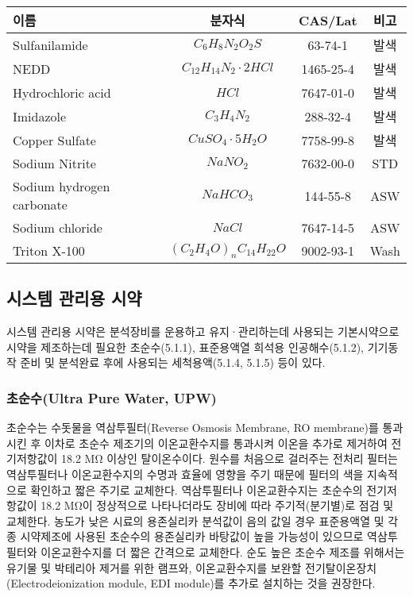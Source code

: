 \documentclass[
]{book}
\begin{document}
\begin{longtable}[]{@{}lccc@{}}
\toprule()
이름 & 분자식 & CAS/Lat & 비고 \\
\midrule()
\endhead
Sulfanilamide & \(C_6H_8N_2O_2S\) & 63-74-1 & 발색 \\
NEDD & \(C_{12}H_{14}N_2 \cdot 2HCl\) & 1465-25-4 & 발색 \\
Hydrochloric acid & \(HCl\) & 7647-01-0 & 발색 \\
Imidazole & \(C_3H_4N_2\) & 288-32-4 & 발색 \\
Copper Sulfate & \(CuSO_4 \cdot 5H_2O\) & 7758-99-8 & 발색 \\
Sodium Nitrite & \(NaNO_2\) & 7632-00-0 & STD \\
Sodium hydrogen carbonate & \(NaHCO_3\) & 144-55-8 & ASW \\
Sodium chloride & \(NaCl\) & 7647-14-5 & ASW \\
Triton X-100 & \((C_2H_4O)_n C_{14}H_{22}O\) & 9002-93-1 & Wash \\
\bottomrule()
\end{longtable}

\hypertarget{uxc2dcuxc2a4uxd15c-uxad00uxb9acuxc6a9-uxc2dcuxc57d}{%
\subsection{시스템 관리용 시약}\label{uxc2dcuxc2a4uxd15c-uxad00uxb9acuxc6a9-uxc2dcuxc57d}}

시스템 관리용 시약은 분석장비를 운용하고 유지·관리하는데 사용되는 기본시약으로 시약을 제조하는데 필요한 초순수(5.1.1), 표준용액열 희석용 인공해수(5.1.2), 기기동작 준비 및 분석완료 후에 사용되는 세척용액(5.1.4, 5.1.5) 등이 있다.

\hypertarget{uxcd08uxc21cuxc218ultra-pure-water-upw}{%
\subsubsection{초순수(Ultra Pure Water, UPW)}\label{uxcd08uxc21cuxc218ultra-pure-water-upw}}

초순수는 수돗물을 역삼투필터(Reverse Osmosis Membrane, RO membrane)를 통과시킨 후 이차로 초순수 제조기의 이온교환수지를 통과시켜 이온을 추가로 제거하여 전기저항값이 18.2 MΩ 이상인 탈이온수이다. 원수를 처음으로 걸러주는 전처리 필터는 역삼투필터나 이온교환수지의 수명과 효율에 영향을 주기 때문에 필터의 색을 지속적으로 확인하고 짧은 주기로 교체한다. 역삼투필터나 이온교환수지는 초순수의 전기저항값이 18.2 MΩ이 정상적으로 나타나더라도 장비에 따라 주기적(분기별)로 점검 및 교체한다. 농도가 낮은 시료의 용존실리카 분석값이 음의 값일 경우 표준용액열 및 각종 시약제조에 사용된 초순수의 용존실리카 바탕값이 높을 가능성이 있으므로 역삼투필터와 이온교환수지를 더 짧은 간격으로 교체한다. 순도 높은 초순수 제조를 위해서는 유기물 및 박테리아 제거를 위한 램프와, 이온교환수지를 보완할 전기탈이온장치(Electrodeionization module, EDI module)를 추가로 설치하는 것을 권장한다.
\end{document}
